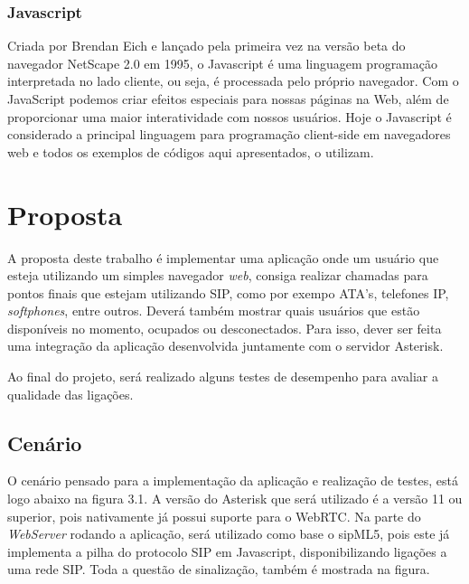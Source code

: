 \documentclass[12pt,a4paper,oneside]{report}
\begin{document}
\subsection{Javascript}
\label{ss_javascript}
Criada por Brendan Eich e lançado pela primeira vez na versão beta do navegador NetScape 2.0 em 1995, o Javascript é uma linguagem programação interpretada no lado cliente, ou seja, é processada pelo próprio navegador. Com o JavaScript podemos criar efeitos especiais para nossas páginas na Web, além de proporcionar uma maior interatividade com nossos usuários. \cite{JAVASCRIPT}
Hoje o Javascript é considerado a principal linguagem para programação client-side em navegadores web e todos os exemplos de códigos aqui apresentados, o utilizam. 

\chapter{Proposta} %
\label{c_bibliografia} %

A proposta deste trabalho é implementar uma aplicação onde um usuário que esteja utilizando um simples navegador \textit{web}, consiga realizar chamadas para pontos finais que estejam utilizando SIP, como por exempo ATA's, telefones IP, \textit{softphones}, entre outros. Deverá também mostrar quais usuários que estão disponíveis no momento, ocupados ou desconectados.
Para isso, dever ser feita uma integração da aplicação desenvolvida juntamente com o servidor Asterisk.

Ao final do projeto, será realizado alguns testes de desempenho para avaliar a qualidade das ligações.

\section{Cenário}
\label{s_cenario} %

O cenário pensado para a implementação da aplicação e realização de testes, está logo abaixo na figura 3.1. A versão do Asterisk que será utilizado é a versão 11 ou superior, pois nativamente já possui suporte para o WebRTC. Na parte do \textit{WebServer} rodando a aplicação, será utilizado como base o sipML5, pois este já implementa a pilha do protocolo SIP em Javascript, disponibilizando ligações a uma rede SIP. Toda a questão de sinalização, também é mostrada na figura.
\end{document}
